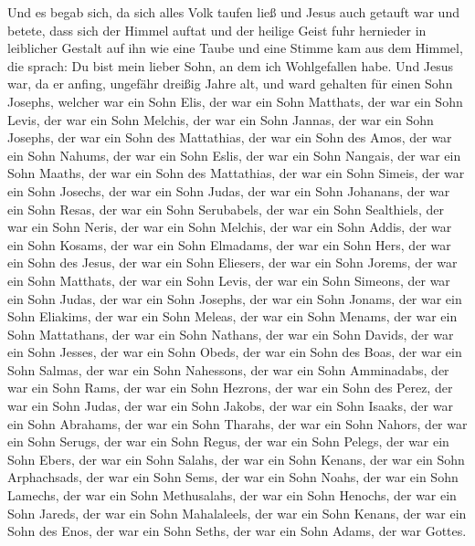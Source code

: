  Und es begab sich, da sich alles Volk taufen ließ und
Jesus auch getauft war und betete, dass sich der Himmel auftat
 und der heilige Geist fuhr hernieder in leiblicher
Gestalt auf ihn wie eine Taube und eine Stimme kam aus dem Himmel, die
sprach: Du bist mein lieber Sohn, an dem ich Wohlgefallen habe.
 Und Jesus war, da er anfing, ungefähr dreißig Jahre alt,
und ward gehalten für einen Sohn Josephs, welcher war ein Sohn Elis,
 der war ein Sohn Matthats, der war ein Sohn Levis, der
war ein Sohn Melchis, der war ein Sohn Jannas, der war ein Sohn Josephs,
 der war ein Sohn des Mattathias, der war ein Sohn des
Amos, der war ein Sohn Nahums, der war ein Sohn Eslis, der war ein Sohn
Nangais,  der war ein Sohn Maaths, der war ein Sohn des
Mattathias, der war ein Sohn Simeis, der war ein Sohn Josechs, der war
ein Sohn Judas,  der war ein Sohn Johanans, der war ein
Sohn Resas, der war ein Sohn Serubabels, der war ein Sohn Sealthiels,
der war ein Sohn Neris,  der war ein Sohn Melchis, der
war ein Sohn Addis, der war ein Sohn Kosams, der war ein Sohn Elmadams,
der war ein Sohn Hers,  der war ein Sohn des Jesus, der
war ein Sohn Eliesers, der war ein Sohn Jorems, der war ein Sohn
Matthats, der war ein Sohn Levis,  der war ein Sohn
Simeons, der war ein Sohn Judas, der war ein Sohn Josephs, der war ein
Sohn Jonams, der war ein Sohn Eliakims,  der war ein Sohn
Meleas, der war ein Sohn Menams, der war ein Sohn Mattathans, der war
ein Sohn Nathans, der war ein Sohn Davids,  der war ein
Sohn Jesses, der war ein Sohn Obeds, der war ein Sohn des Boas, der war
ein Sohn Salmas, der war ein Sohn Nahessons,  der war ein
Sohn Amminadabs, der war ein Sohn Rams, der war ein Sohn Hezrons, der
war ein Sohn des Perez, der war ein Sohn Judas,  der war
ein Sohn Jakobs, der war ein Sohn Isaaks, der war ein Sohn Abrahams, der
war ein Sohn Tharahs, der war ein Sohn Nahors,  der war
ein Sohn Serugs, der war ein Sohn Regus, der war ein Sohn Pelegs, der
war ein Sohn Ebers, der war ein Sohn Salahs,  der war ein
Sohn Kenans, der war ein Sohn Arphachsads, der war ein Sohn Sems, der
war ein Sohn Noahs, der war ein Sohn Lamechs,  der war
ein Sohn Methusalahs, der war ein Sohn Henochs, der war ein Sohn Jareds,
der war ein Sohn Mahalaleels, der war ein Sohn Kenans, 
der war ein Sohn des Enos, der war ein Sohn Seths, der war ein Sohn
Adams, der war Gottes.

